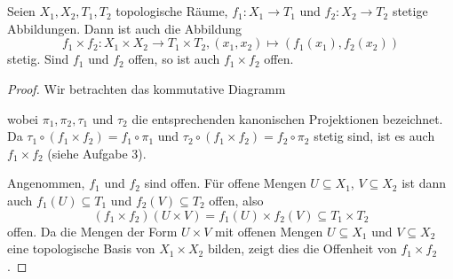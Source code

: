 \documentclass[a4paper,10pt]{article}
\begin{document}
\section{}

\begin{lem}\label{lem: Funktionsprodukt}
 Seien $X_1, X_2, T_1, T_2$ topologische Räume, $f_1 : X_1 \to T_1$ und $f_2 : X_2 \to T_2$ stetige Abbildungen. Dann ist auch die Abbildung
 \[
  f_1 \times f_2 : X_1 \times X_2 \to T_1 \times T_2, (x_1, x_2) \mapsto (f_1(x_1), f_2(x_2))
 \]
 stetig. Sind $f_1$ und $f_2$ offen, so ist auch $f_1 \times f_2$ offen.
\end{lem}
\begin{proof}
 Wir betrachten das kommutative Diagramm
 \begin{center}
 \end{center}
 wobei $\pi_1, \pi_2, \tau_1$ und $\tau_2$ die entsprechenden kanonischen Projektionen bezeichnet. Da $\tau_1 \circ (f_1 \times f_2) = f_1 \circ \pi_1$ und $\tau_2 \circ (f_1 \times f_2) = f_2 \circ \pi_2$ stetig sind, ist es auch $f_1 \times f_2$ (siehe Aufgabe 3).
 
 Angenommen, $f_1$ und $f_2$ sind offen. Für offene Mengen $U \subseteq X_1$, $V \subseteq X_2$ ist dann auch $f_1(U) \subseteq T_1$ und $f_2(V) \subseteq T_2$ offen, also
 \[
  (f_1 \times f_2)(U \times V) = f_1(U) \times f_2(V) \subseteq T_1 \times T_2
 \]
 offen. Da die Mengen der Form $U \times V$ mit offenen Mengen $U \subseteq X_1$ und $V \subseteq X_2$ eine topologische Basis von $X_1 \times X_2$ bilden, zeigt dies die Offenheit von $f_1 \times f_2$.
\end{proof}
\end{document}
